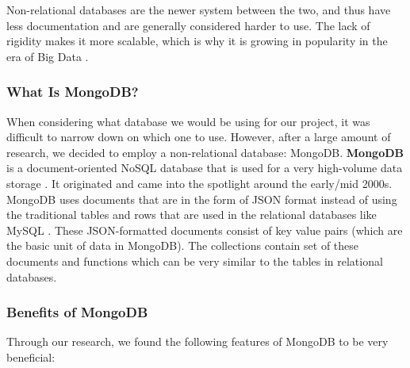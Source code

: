 \documentclass[titlepage, 12pt]{article}
\begin{document}
Non-relational databases are the newer system between the two, and thus have less documentation and are generally considered harder to use. The lack of rigidity makes it more scalable, which is why it is growing in popularity in the era of Big Data \cite{bib-2-5}.

\subsubsection{What Is MongoDB?}

When considering what database we would be using for our project, it was difficult to narrow down on which one to use. However, after a large amount of research, we decided to employ a non-relational database: MongoDB. \textbf{MongoDB} is a document-oriented NoSQL database that is used for a very high-volume data storage \cite{bib-2-6}. It originated and came into the spotlight around the early/mid 2000s. MongoDB uses documents that are in the form of JSON format instead of using the traditional tables and rows that are used in the relational databases like MySQL \cite{bib-2-6}. These JSON-formatted documents consist of key value pairs (which are the basic unit of data in MongoDB). The collections contain set of these documents and functions which can be very similar to the tables in relational databases. 

\subsubsection{Benefits of MongoDB}

Through our research, we found the following features of MongoDB to be very beneficial:
\end{document}
